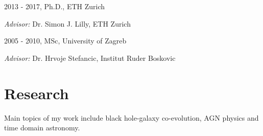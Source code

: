 \documentclass[11pt,letterpaper]{article}
\renewenvironment{itemize}{
  \begin{list}{}{
    \setlength{\leftmargin}{1.5em}
    \setlength{\itemsep}{0.10em}
    \setlength{\parskip}{0pt}
    \setlength{\parsep}{0.10em}
  }
}{
  \end{list}
}
\begin{document}
\begin{itemize}
  \item 2013 - 2017, Ph.D., ETH Zurich
  \begin{itemize}
  \item \textit{Advisor:} Dr. Simon J. Lilly, ETH Zurich

\end{itemize}  




  \item 2005 - 2010, MSc, University of Zagreb
  \begin{itemize}
            \item \textit{Advisor:}
      Dr. Hrvoje  Stefancic, Institut Ruder Boskovic

\end{itemize}  
\end{itemize}

\section*{Research}
 Main topics of my work include black hole-galaxy co-evolution, AGN physics and time domain astronomy. %
 
\end{document}

